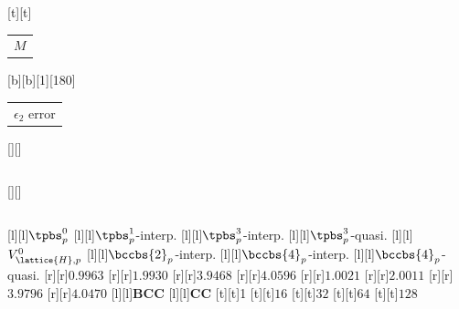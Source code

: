 %    
%
%
\begin{psfrags}%
\psfragscanon%
%
[t][t]{\color[rgb]{0,0,0}\setlength{\tabcolsep}{0pt}\begin{tabular}{c}$M$\end{tabular}}%
[b][b][1][180]{\color[rgb]{0,0,0}\setlength{\tabcolsep}{0pt}\begin{tabular}{c}$\epsilon_{2}$
error\end{tabular}}%
[][]{\color[rgb]{0,0,0}\setlength{\tabcolsep}{0pt}\begin{tabular}{c}
\end{tabular}}%
[][]{\color[rgb]{0,0,0}\setlength{\tabcolsep}{0pt}\begin{tabular}{c}
\end{tabular}}%
%
[l][l]{\color[rgb]{0,0,0}$\tpbs^0_p$}%
[l][l]{\color[rgb]{0,0,0}$\tpbs^1_p$-\small{interp.}}%
[l][l]{\color[rgb]{0,0,0}$\tpbs^3_p$-\small{interp.}}%
[l][l]{\color[rgb]{0,0,0}$\tpbs^3_p$-\small{quasi.}}%
%
[l][l]{\color[rgb]{0,0,0}$V_{\lattice{H},p}^0$}%
[l][l]{\color[rgb]{0,0,0}$\bccbs{2}_p$-\small{interp.}}%
[l][l]{\color[rgb]{0,0,0}$\bccbs{4}_p$-\small{interp.}}%
[l][l]{\color[rgb]{0,0,0}$\bccbs{4}_p$-\small{quasi.}}%
%
[r][r]{\color[rgb]{0,0,0}$0.9963$}%
[r][r]{\color[rgb]{0,0,0}$1.9930$}%
[r][r]{\color[rgb]{0,0,0}$3.9468$}%
[r][r]{\color[rgb]{0,0,0}$4.0596$}%
%
[r][r]{\color[rgb]{0,0,0}$1.0021$}%
[r][r]{\color[rgb]{0,0,0}$2.0011$}%
[r][r]{\color[rgb]{0,0,0}$3.9796$}%
[r][r]{\color[rgb]{0,0,0}$4.0470$}%
%
%
[l][l]{\color[rgb]{0,0,0}\textbf{BCC}}%
[l][l]{\color[rgb]{0,0,0}\textbf{CC}}%
[t][t]{1}%
[t][t]{${16}$}%
[t][t]{${32}$}%
[t][t]{${64}$}%
[t][t]{${128}$}%

\end{psfrags}
